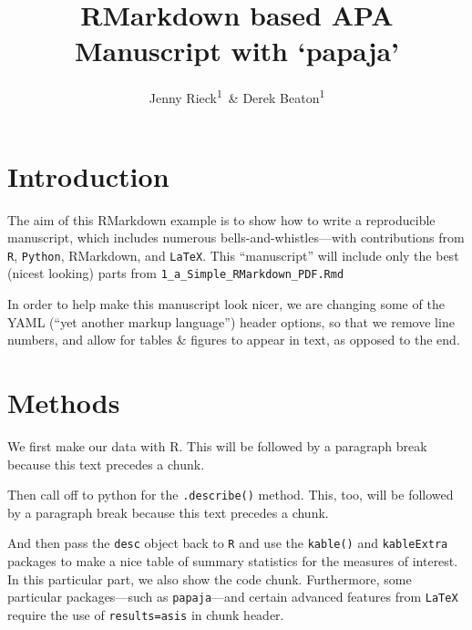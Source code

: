 \documentclass[man,floatsintext]{apa6}
\title{RMarkdown based APA Manuscript with `papaja'}
\author{Jenny Rieck\textsuperscript{1}~\& Derek Beaton\textsuperscript{1}}
\date{}
\affiliation{
\vspace{0.5cm}
\textsuperscript{1} Rotman Research Institute}
\newenvironment{Shaded}{\begin{snugshade}}{\end{snugshade}}
\newcommand{\DataTypeTok}[1]{\textcolor[rgb]{0.13,0.29,0.53}{#1}}
\newcommand{\KeywordTok}[1]{\textcolor[rgb]{0.13,0.29,0.53}{\textbf{#1}}}
\newcommand{\NormalTok}[1]{#1}
\newcommand{\OperatorTok}[1]{\textcolor[rgb]{0.81,0.36,0.00}{\textbf{#1}}}
\newcommand{\StringTok}[1]{\textcolor[rgb]{0.31,0.60,0.02}{#1}}
\theoremstyle{definition}
\theoremstyle{definition}
\theoremstyle{definition}
\theoremstyle{remark}
\begin{document}
\maketitle

\hypertarget{introduction}{%
\section{Introduction}\label{introduction}}

The aim of this RMarkdown example is to show how to write a reproducible
manuscript, which includes numerous bells-and-whistles---with
contributions from \texttt{R}, \texttt{Python}, RMarkdown, and
\texttt{LaTeX}. This \enquote{manuscript} will include only the best
(nicest looking) parts from \texttt{1\_a\_Simple\_RMarkdown\_PDF.Rmd}

In order to help make this manuscript look nicer, we are changing some
of the YAML (\enquote{yet another markup language}) header options, so
that we remove line numbers, and allow for tables \& figures to appear
in text, as opposed to the end.

\hypertarget{methods}{%
\section{Methods}\label{methods}}

We first make our data with R. This will be followed by a paragraph
break because this text precedes a chunk.

Then call off to python for the \texttt{.describe()} method. This, too,
will be followed by a paragraph break because this text precedes a
chunk.

And then pass the \texttt{desc} object back to \texttt{R} and use the
\texttt{kable()} and \texttt{kableExtra} packages to make a nice table
of summary statistics for the measures of interest. In this particular
part, we also show the code chunk. Furthermore, some particular
packages---such as \texttt{papaja}---and certain advanced features from
\texttt{LaTeX} require the use of
\texttt{results=\textquotesingle{}asis\textquotesingle{}} in chunk
header.

\begin{Shaded}
\end{Shaded}
\end{document}
